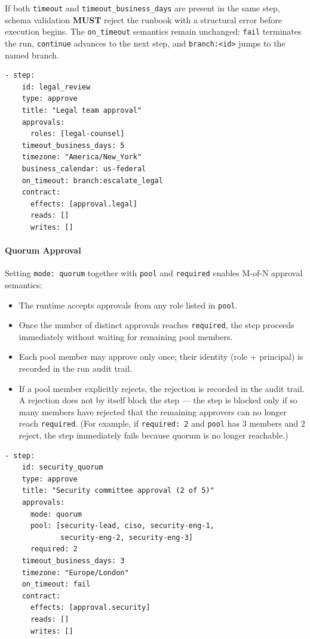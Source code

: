 If both \texttt{timeout} and \texttt{timeout\_business\_days} are present in the
same step, schema validation \textbf{MUST} reject the runbook with a structural
error before execution begins.  The \texttt{on\_timeout} semantics remain
unchanged: \texttt{fail} terminates the run, \texttt{continue} advances to the
next step, and \texttt{branch:<id>} jumps to the named branch.

\begin{verbatim}
- step:
    id: legal_review
    type: approve
    title: "Legal team approval"
    approvals:
      roles: [legal-counsel]
    timeout_business_days: 5
    timezone: "America/New_York"
    business_calendar: us-federal
    on_timeout: branch:escalate_legal
    contract:
      effects: [approval.legal]
      reads: []
      writes: []
\end{verbatim}

\paragraph{Quorum Approval}

Setting \texttt{mode: quorum} together with \texttt{pool} and \texttt{required}
enables M-of-N approval semantics:

\begin{itemize}
  \item The runtime accepts approvals from any role listed in \texttt{pool}.
  \item Once the number of distinct approvals reaches \texttt{required}, the step
        proceeds immediately without waiting for remaining pool members.
  \item Each pool member may approve only once; their identity (role + principal)
        is recorded in the run audit trail.
  \item If a pool member explicitly rejects, the rejection is recorded in the
        audit trail.  A rejection does not by itself block the step --- the step
        is blocked only if so many members have rejected that the remaining
        approvers can no longer reach \texttt{required}.  (For example, if
        \texttt{required: 2} and \texttt{pool} has 3 members and 2 reject, the
        step immediately fails because quorum is no longer reachable.)
\end{itemize}

\begin{verbatim}
- step:
    id: security_quorum
    type: approve
    title: "Security committee approval (2 of 5)"
    approvals:
      mode: quorum
      pool: [security-lead, ciso, security-eng-1,
             security-eng-2, security-eng-3]
      required: 2
    timeout_business_days: 3
    timezone: "Europe/London"
    on_timeout: fail
    contract:
      effects: [approval.security]
      reads: []
      writes: []
\end{verbatim}

